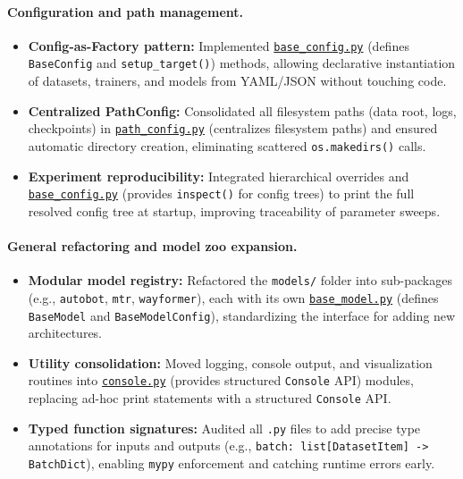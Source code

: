 \paragraph{Configuration and path management.}
\begin{itemize}[leftmargin=*]
  \item \textbf{Config-as-Factory pattern:} Implemented \href{https://github.com/JanDuchscherer104/UniTraj/blob/main/unitraj/utils/base_config.py}{\texttt{base\_config.py}} (defines \texttt{BaseConfig} and \texttt{setup\_target()}) methods, allowing declarative instantiation of datasets, trainers, and models from YAML/JSON without touching code.
  \item \textbf{Centralized PathConfig:} Consolidated all filesystem paths (data root, logs, checkpoints) in \href{https://github.com/JanDuchscherer104/UniTraj/blob/main/unitraj/configs/path_config.py}{\texttt{path\_config.py}} (centralizes filesystem paths) and ensured automatic directory creation, eliminating scattered \texttt{os.makedirs()} calls.
  \item \textbf{Experiment reproducibility:} Integrated hierarchical overrides and \href{https://github.com/JanDuchscherer104/UniTraj/blob/main/unitraj/utils/base_config.py}{\texttt{base\_config.py}} (provides \texttt{inspect()} for config trees) to print the full resolved config tree at startup, improving traceability of parameter sweeps.
\end{itemize}

\paragraph{General refactoring and model zoo expansion.}
\begin{itemize}[leftmargin=*]
  \item \textbf{Modular model registry:} Refactored the \texttt{models/} folder into sub-packages (e.g., \texttt{autobot}, \texttt{mtr}, \texttt{wayformer}), each with its own \href{https://github.com/JanDuchscherer104/UniTraj/blob/main/unitraj/models/base_model/base_model.py}{\texttt{base\_model.py}} (defines \texttt{BaseModel} and \texttt{BaseModelConfig}), standardizing the interface for adding new architectures.
  \item \textbf{Utility consolidation:} Moved logging, console output, and visualization routines into \href{https://github.com/JanDuchscherer104/UniTraj/blob/main/unitraj/utils/console.py}{\texttt{console.py}} (provides structured \texttt{Console} API) modules, replacing ad-hoc print statements with a structured \texttt{Console} API.
  \item \textbf{Typed function signatures:} Audited all \texttt{.py} files to add precise type annotations for inputs and outputs (e.g., \texttt{batch: list[DatasetItem] -> BatchDict}), enabling \texttt{mypy} enforcement and catching runtime errors early.
\end{itemize}

\newpage